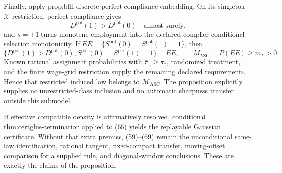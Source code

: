 Finally, apply \(\text{prop:bffl-discrete-perfect-compliance-embedding}\).  On its singleton-\(\mathcal X\) restriction, perfect compliance gives
\[
 D^{\mathrm{pot}}(1)>D^{\mathrm{pot}}(0)
 \quad\text{almost surely},
 \tag{70}
\]
and \(s=+1\) turns monotone employment into the declared complier-conditional selection monotonicity.  If \(EE=\{S^{\mathrm{pot}}(0)=S^{\mathrm{pot}}(1)=1\}\), then
\[
 \{D^{\mathrm{pot}}(1)>D^{\mathrm{pot}}(0),
 S^{\mathrm{pot}}(0)=S^{\mathrm{pot}}(1)=1\}=EE,
 \qquad
 M_{\mathrm{ASC}}=P(EE)\ge m_*>0.
 \tag{71}
\]
Known rational assignment probabilities with \(\bar\pi_z\ge\pi_*\), randomized treatment, and the finite wage-grid restriction supply the remaining declared requirements.  Hence that restricted induced law belongs to \(\mathcal M_{\mathrm{ASC}}\).  The proposition explicitly supplies no unrestricted-class inclusion and no automatic sharpness transfer outside this submodel.

If effective compatible density is affirmatively resolved, conditional \(\text{thm:certglue-termination}\) applied to (66) yields the replayable Gaussian certificate.  Without that extra premise, (59)--(69) remain the unconditional same-law identification, rational tangent, fixed-compact transfer, moving-offset comparison for a supplied rule, and diagonal-window conclusions.  These are exactly the claims of the proposition.
